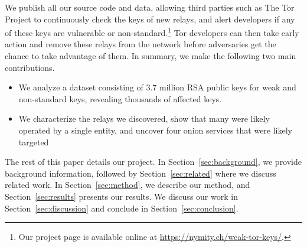We publish all our source code and data, allowing third parties such as The Tor
Project to continuously check the keys of new relays, and alert developers if
any of these keys are vulnerable or non-standard.\footnote{Our project page is
available online at \url{https://nymity.ch/weak-tor-keys/}.}  Tor developers can
then take early action and remove these relays from the network before
adversaries get the chance to take advantage of them.  In summary, we make the
following two main contributions.
\begin{itemize}
	\item We analyze a dataset consisting of 3.7 million RSA public keys for
		weak and non-standard keys, revealing thousands of affected keys.

	\item We characterize the relays we discovered, show that many were
		likely operated by a single entity, and uncover four onion services that
		were likely targeted
\end{itemize}

The rest of this paper details our project.  In Section~\ref{sec:background}, we
provide background information, followed by Section~\ref{sec:related} where we 
discuss related work.  In Section~\ref{sec:method}, we describe our method,
and Section~\ref{sec:results} presents our results.  We discuss our work in
Section~\ref{sec:discussion} and conclude in Section~\ref{sec:conclusion}.
